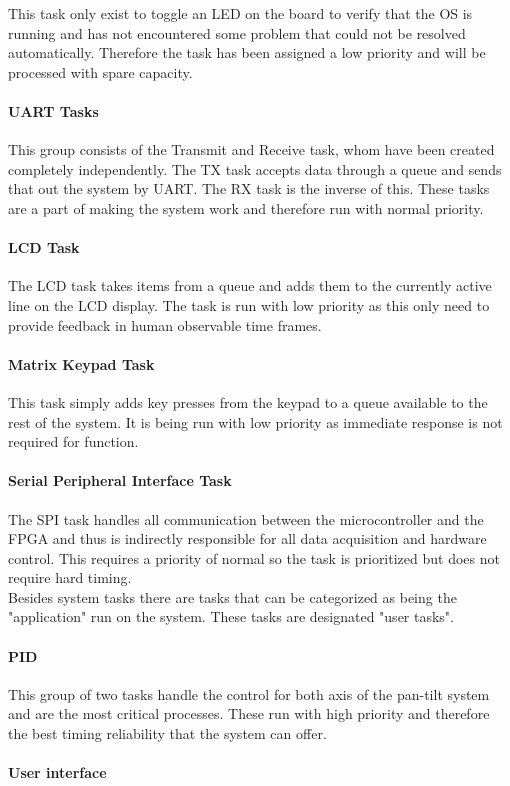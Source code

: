 \documentclass[../../../main]{subfiles}
\begin{document}
This task only exist to toggle an LED on the board to verify that the OS is running and has not encountered some problem that could not be resolved automatically. Therefore the task has been assigned a low priority and will be processed with spare capacity.

\paragraph{UART Tasks}%

This group consists of the Transmit and Receive task, whom have been created completely independently. The TX task accepts data through a queue and sends that out the system by UART. The RX task is the inverse of this. These tasks are a part of making the system work and therefore run with normal priority. 


\paragraph{LCD Task}

The LCD task takes items from a queue and adds them to the currently active line on the LCD display. The task is run with low  priority as this only need to provide feedback in human observable time frames.

\paragraph{Matrix Keypad Task}

This task simply adds key presses from the keypad to a queue available to the rest of the system. It is being run with low priority as immediate response is not required for function.

\paragraph{Serial Peripheral Interface Task}

The SPI task handles all communication between the microcontroller and the FPGA and thus is indirectly responsible for all data acquisition and hardware control. This requires a priority of normal  so the task is prioritized but does not require hard timing.\\

Besides system tasks there are tasks that can be categorized as being the "application" run on the system. These tasks are designated "user tasks".

\paragraph{PID}

This group of two tasks handle the control for both axis of the pan-tilt system and are the most critical processes. These run with high priority and therefore the best timing reliability that the system can offer.

\paragraph{User interface}
\end{document}
